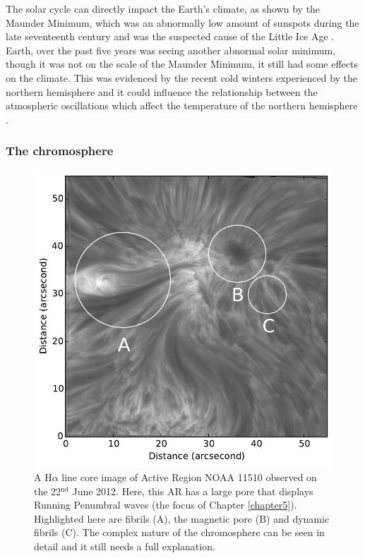     The solar cycle can directly impact the Earth's climate, as shown by the Maunder Minimum, which was an abnormally low amount of sunspots during the late seventeenth century and was the suspected cause of the Little Ice Age \citep{climate}.
    Earth, over the past five years was seeing another abnormal solar minimum, though it was not on the scale of the Maunder Minimum, it still had some effects on the climate.
    This was evidenced by the recent cold winters experienced by the northern hemisphere and it could influence the relationship between the atmospheric oscillations which affect the temperature of the northern hemisphere \citep{CWE,NAO,SCR}. 
   
\subsubsection{The chromosphere}
\label{chromo}

    \begin{figure}
        \centering
        \includegraphics[width=\textwidth]{Chromo.pdf}
        \caption{
                 A H$\alpha$ line core image of Active Region NOAA 11510 observed on the 22$^{\mathrm{nd}}$ June 2012.
                 Here, this AR has a large pore that displays Running Penumbral waves (the focus of Chapter \ref{chapter5}).
                 Highlighted here are fibrils (A), the magnetic pore (B) and dynamic fibrils (C).
                 The complex nature of the chromosphere can be seen in detail and it still needs a full explanation.
                }
        \label{fig:chromosphere}
    \end{figure}   

